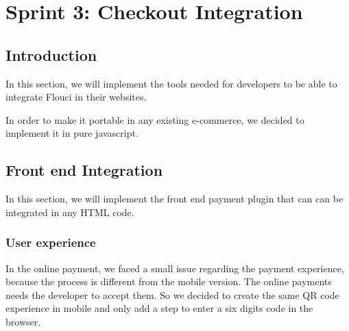 
\setcounter{chapter}{4}
\chapter{Sprint 3: Checkout Integration}
\minitoc %
\graphicspath{{Chapter5/figures/}}

\pagestyle{fancy}
\fancyhf{}
\fancyhead[R]{\bfseries\rightmark}
\fancyfoot[R]{\thepage}
\renewcommand{\headrulewidth}{0.5pt}
\renewcommand{\footrulewidth}{0pt}
\renewcommand{\chaptermark}[1]{\markboth{\MakeUppercase{\chaptername~\thechapter. #1 }}{}}
\renewcommand{\sectionmark}[1]{\markright{\thechapter.\thesection~ #1}}


\begin{spacing}{1.2}

\section*{Introduction}
In this section, we will implement the tools needed for developers to be able to integrate Flouci in their websites. 

In order to make it portable in any existing e-commerce, we decided to implement it in pure javascript.
\section{Front end Integration}
In this section, we will implement the front end payment plugin that can can be integrated in any HTML code.
\subsection{User experience}
In the online payment, we faced a small issue regarding the payment experience, because the process is different from the mobile version. The online payments needs the developer to accept them.
So we decided to create the same QR code experience in mobile and only add a step to enter a six digits code in the browser.


\end{spacing}
